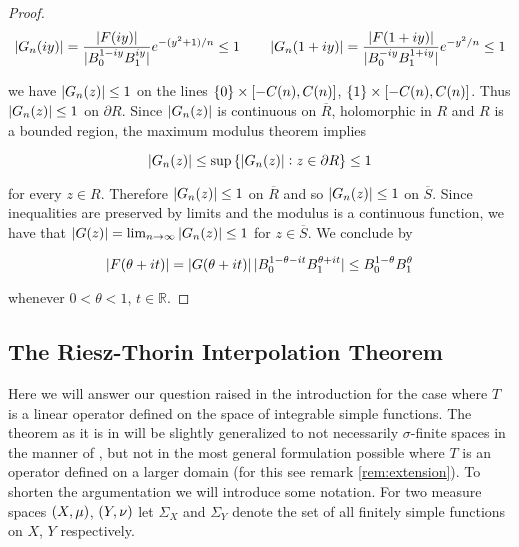 \begin{proof}
\begin{equation*}
	\abs[0]{ G_n(iy)} = \frac{\abs[0]{F(iy)}}{\abs[0]{B_0^{1 - iy} B_1^{iy}}}e^{-\del[0]{y^2 + 1 }/n} \leq 1 \qquad \abs[0]{ G_n(1 + iy)} =	\frac{\abs[0]{ F(1 + iy)}}{\abs[0]{ B_0^{-iy}B_1^{1 + iy}}}e^{-y^2/n} \leq 1
\end{equation*}

\noindent we have $\abs[0]{ G_n(z)} \leq 1$ on the lines $\cbr{0} \times \intcc[0]{-C(n),C(n)}$, $\cbr{1} \times \intcc[0]{-C(n),C(n)}$. Thus $\abs[0]{ G_n(z) } \leq 1$ on $\partial R$. Since $\abs[0]{ G_n(z)}$ is continuous on $\overline{R}$, holomorphic in $R$ and $R$ is a bounded region, the maximum modulus theorem implies

\begin{equation*}
	\abs[0]{ G_n(z)} \leq \sup\cbr[0]{\abs[0]{G_n(z) } : z \in \partial R} \leq 1
\end{equation*}

\noindent for every $z \in R$. Therefore $\abs[0]{ G_n(z)} \leq 1$ on $\overline{R}$ and so $\abs[0]{ G_n(z)}\leq 1$ on $\overline{S}$. Since inequalities are preserved by limits and the modulus is a continuous function, we have that $\abs[0]{ G(z)} = \lim_{n \to \infty} \abs[0]{ G_n(z) } \leq 1$ for $z \in \overline{S}$. We conclude by 

\begin{equation*}
	\abs[0]{ F(\theta + it) } = \abs[0]{ G(\theta + it)} \abs[0]{B_0^{1 - \theta - it}B_1^{\theta + it}} \leq B_0^{1 - \theta} B_1^{\theta}
\end{equation*}

\noindent whenever $0 < \theta < 1$, $t \in \mathbb{R}$.
\end{proof}

\subsection{The Riesz-Thorin Interpolation Theorem}
Here we will answer our question raised in the introduction for the case where $T$ is a linear operator defined on the space of integrable simple functions. The theorem as it is in \cite[37]{grafakos:fourier:2014} will be slightly generalized to not necessarily $\sigma$-finite spaces in the manner of \cite[200]{folland:real_analysis:1999}, but not in the most general formulation possible where $T$ is an operator defined on a larger domain (for this see remark \ref{rem:extension}). To shorten the argumentation we will introduce some notation. For two measure spaces $\del[0]{ X,\mu }$, $\del[0]{ Y,\nu }$ let $\Sigma_X$ and $\Sigma_Y$ denote the set of all finitely simple functions on $X$, $Y$ respectively.


